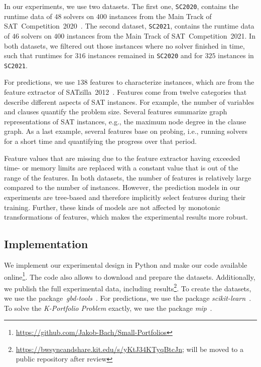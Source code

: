 \documentclass[a4paper,USenglish,pdfa]{lipics-v2021} %
\begin{document}
In our experiments, we use two datasets. 
The first one, \texttt{SC2020}, contains the runtime data of $48$ solvers on $400$ instances from the Main Track of SAT~Competition~2020~\cite{balyo2020proceedings,SC2020:AIJ}.
The second dataset, \texttt{SC2021}, contains the runtime data of $46$ solvers on $400$ instances from the Main Track of SAT~Competition~2021. 
In both datasets, we filtered out those instances where no solver finished in time, such that runtimes for $316$ instances remained in \texttt{SC2020} and for $325$ instances in \texttt{SC2021}.

For predictions, we use $138$ features to characterize instances, which are from the feature extractor of SATzilla~2012~\cite{xu2012features}. 
Features come from twelve categories that describe different aspects of SAT instances.
For example, the number of variables and clauses quantify the problem size.
Several features summarize graph representations of SAT instances, e.g., the maximum node degree in the clause graph.
As a last example, several features base on probing, i.e., running solvers for a short time and quantifying the progress over that period.

Feature values that are missing due to the feature extractor having exceeded time- or memory limits are replaced with a constant value that is out of the range of the features.
In both datasets, the number of features is relatively large compared to the number of instances.
However, the prediction models in our experiments are tree-based and therefore implicitly select features during their training.
Further, these kinds of models are not affected by monotonic transformations of features, which makes the experimental results more robust.

\subsection{Implementation}
\label{sec:experimental-design:impl}

We implement our experimental design in Python and make our code available online\footnote{\url{https://github.com/Jakob-Bach/Small-Portfolios}}.
The code also allows to download and prepare the datasets.
Additionally, we publish the full experimental data, including results\footnote{\url{https://bwsyncandshare.kit.edu/s/yKtJ34KTyqBtcJn}; will be moved to a public repository after review}.
To create the datasets, we use the package~\emph{gbd-tools}~\cite{iser2020collaborative}.
For predictions, we use the package \emph{scikit-learn}~\cite{scikit-learn}.
To solve the \emph{K-Portfolio Problem} exactly, we use the package \emph{mip}~\cite{python-mip}.
\end{document}

